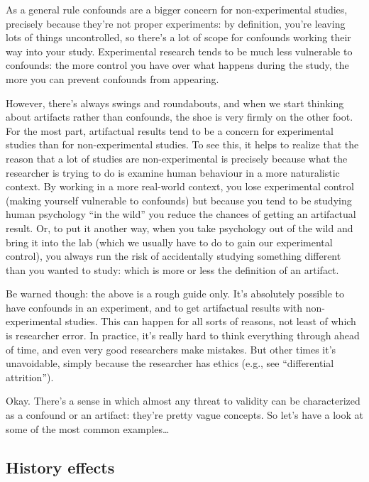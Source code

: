 \documentclass[]{book}
\begin{document}
As a general rule confounds are a bigger concern for non-experimental studies, precisely because they're not proper experiments: by definition, you're leaving lots of things uncontrolled, so there's a lot of scope for confounds working their way into your study. Experimental research tends to be much less vulnerable to confounds: the more control you have over what happens during the study, the more you can prevent confounds from appearing.

However, there's always swings and roundabouts, and when we start thinking about artifacts rather than confounds, the shoe is very firmly on the other foot. For the most part, artifactual results tend to be a concern for experimental studies than for non-experimental studies. To see this, it helps to realize that the reason that a lot of studies are non-experimental is precisely because what the researcher is trying to do is examine human behaviour in a more naturalistic context. By working in a more real-world context, you lose experimental control (making yourself vulnerable to confounds) but because you tend to be studying human psychology ``in the wild'' you reduce the chances of getting an artifactual result. Or, to put it another way, when you take psychology out of the wild and bring it into the lab (which we usually have to do to gain our experimental control), you always run the risk of accidentally studying something different than you wanted to study: which is more or less the definition of an artifact.

Be warned though: the above is a rough guide only. It's absolutely possible to have confounds in an experiment, and to get artifactual results with non-experimental studies. This can happen for all sorts of reasons, not least of which is researcher error. In practice, it's really hard to think everything through ahead of time, and even very good researchers make mistakes. But other times it's unavoidable, simply because the researcher has ethics (e.g., see ``differential attrition'').

Okay. There's a sense in which almost any threat to validity can be characterized as a confound or an artifact: they're pretty vague concepts. So let's have a look at some of the most common examples\ldots{}

\hypertarget{history-effects}{%
\subsection{History effects}\label{history-effects}}
\end{document}
